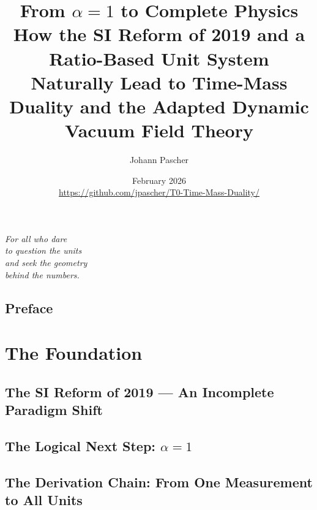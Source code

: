 \documentclass[11pt,twoside,openright]{book}
\title{%
  {\LARGE From $\alpha = 1$ to Complete Physics}\\[10pt]
  {\normalsize How the SI Reform of 2019 and a Ratio-Based Unit System
  Naturally Lead to Time-Mass Duality and the
  Adapted Dynamic Vacuum Field Theory}
}
\author{Johann Pascher}
\date{February 2026\\[6pt]
  \footnotesize\url{https://github.com/jpascher/T0-Time-Mass-Duality/}}
\begin{document}
\frontmatter

\thispagestyle{empty}
\restoregeometry
\cleardoublepage

\maketitle

\cleardoublepage
\thispagestyle{empty}
\vspace*{0.3\textheight}
\begin{center}
\itshape\large
For all who dare\\
to question the units\\
and seek the geometry\\
behind the numbers.
\end{center}
\vfill

\tableofcontents

\chapter{Preface}


\mainmatter

\part{The Foundation}

\chapter{The SI Reform of 2019 --- An Incomplete Paradigm Shift}


\chapter{The Logical Next Step: $\alpha = 1$}\label{ch:alpha}


\chapter{The Derivation Chain: From One Measurement to All Units}

\end{document}
